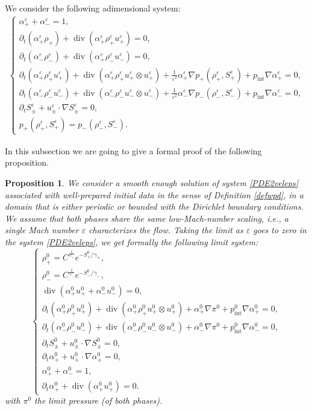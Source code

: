 \documentclass[11pt, twoside, a4paper]{article}
\theoremstyle{plain}
\newtheorem{proposition}[theorem]{Proposition}
\theoremstyle{remark}
\numberwithin{equation}{section}
\renewcommand{\div}{\operatorname{div}}
\renewcommand{\epsilon}{\varepsilon}
\newcommand{\dt}{\partial_t}
\newcommand{\eps}{\varepsilon}
\newcommand{\ap}{\alpha_+}
\newcommand{\am}{\alpha_-}
\newcommand{\rp}{\rho_+}
\newcommand{\rmi}{\rho_-}
\newcommand{\gp}{\gamma_{+}}
\newcommand{\gm}{\gamma_-}
\begin{document}
We consider the following adimensional system:
\begin{align}
    \left\{
        \begin{array}{l}\label{PDE2veleps}
            \ap^\eps + \am^\eps = 1,\\
            \dt (\ap^\eps \rp) + \div(\ap^\eps \rp^\eps u_+^\eps) = 0,\\
            \dt (\am^\eps \rmi^\eps) + \div(\ap^\eps \rmi^\eps u_-^\eps) = 0,\\
            \dt (\ap^\eps \rp^\eps u_+^\eps) + \div (\ap^\eps \rp^\eps u_+^\eps \otimes u_+^\eps) + \frac{1}{\eps^2} \ap^\eps \nabla p_+(\rp^\eps, S_+^\eps) + p_{\mathrm{int}} \nabla \ap^\eps = 0,\\
            \dt (\am^\eps \rmi^\eps u_-^\eps) + \div (\am^\eps \rmi^\eps u_-^\eps \otimes u_-^\eps) + \frac{1}{\eps^2} \am^\eps \nabla p_-(\rmi^\eps, S_-^\eps) + p_{\mathrm{int}} \nabla \am^\eps = 0,\\
            \dt S_\pm^\eps + u_\pm^\eps \cdot \nabla S_\pm^\eps = 0,\\
            p_+(\rp^\eps, S_+^\eps) = p_-(\rmi^\eps, S_-^\eps).
        \end{array}
    \right.
\end{align}

In this subsection we are going to give a formal proof of the following proposition.

\begin{proposition}
We consider a smooth enough solution of system \eqref{PDE2veleps} associated with well-prepared initial data in the sense of Definition \eqref{defwpd}, in a domain that is either periodic or bounded with the Dirichlet boundary conditions. We assume that both phases share the same low-Mach-number scaling, i.e., a single Mach number $\epsilon$ characterizes the flow. Taking the limit as $\eps$ goes to zero in the system \eqref{PDE2veleps}, we get formally the following limit system:
\begin{equation*}
    \begin{cases}
        \rp^0 = C^{\frac{1}{\gp}}e^{-S_+^0/\gp},\\
        \rmi^0 = C^{\frac{1}{\gm}}e^{-S_-^0/\gm},\\
        \div (\ap^0 u_+^0 +\am^0 u_-^0) = 0,\\
        \dt (\ap^0 \rp^0 u_+^0) + \div (\ap^0 \rp^0 u_+^0 \otimes u_+^0) + \ap^0 \nabla \pi^0 + p_{\mathrm{int}}^0 \nabla \ap^0 = 0,\\
        \dt (\am^0 \rmi^0 u_-^0) + \div (\am^0 \rmi^0 u_-^0 \otimes u_-^0) + \am^0 \nabla \pi^0 + p_{\mathrm{int}}^0 \nabla \am^0 = 0,\\
        \dt S_\pm^0 + u_\pm^0 \cdot \nabla S_\pm^0=0,\\
        \dt \alpha_+^0 + u_+^0 \cdot \nabla \alpha_+^0 = 0,\\
        \ap^0 + \am^0 = 1,\\
        \dt \alpha_+^0 + \div (\alpha_+^0 u_+^0) = 0.
    \end{cases}
\end{equation*}
with $\pi^0$ the limit pressure (of both phases).
\end{proposition}
\end{document}
